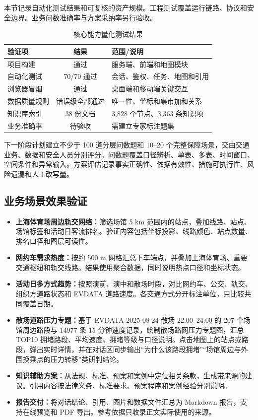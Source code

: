 \documentclass[a4paper,11pt]{article}
\newcommand{\term}[1]{\textbf{#1}}
\begin{document}
本节记录自动化测试结果和可复核的资产规模。工程测试覆盖运行链路、协议和安全边界。业务问数准确率与方案采纳率另行验收。

\begin{table}[ht]
  \centering
  \caption{核心能力量化测试结果}
  \label{tab:tests}
  \begin{tabularx}{\linewidth}{@{}lcX@{}}
    \toprule
    \rowcolor{TableHead}
    \sffamily\bfseries 验证项 & \sffamily\bfseries 结果 & \sffamily\bfseries 范围/说明 \\
    \midrule
    项目构建      & 通过    & 服务端、前端和地图模块 \\
    自动化测试    & 70/70 通过 & 会话、鉴权、任务、地图和引用 \\
    浏览器冒烟    & 通过    & 桌面端和移动端关键交互 \\
    数据质量规则  & 错误级全部通过 & 唯一性、坐标和集市加和关系 \\
    知识库索引    & 38 份文档 & 3,828 个节点、3,363 条知识项 \\
    业务准确率    & 待验收  & 需建立专家标注题集 \\
    \bottomrule
  \end{tabularx}
\end{table}

下一阶段计划建立不少于 100 道分层问数题和 10--20 个完整保障场景，交由交通业务、数据和安全人员分别评分。问数题覆盖口径辨析、单表、多表、时间窗口、空间条件和异常输入。方案评估记录事实正确性、依据有效性、措施可执行性、风险遗漏和人工改写量。

\subsection{业务场景效果验证}

\begin{itemize}
  \item \term{上海体育场周边轨交网络：}筛选场馆 5 km 范围内的站点，叠加线路、站点、场馆标签和活动日客流排名。验证内容包括坐标投影、线路颜色、站点数量、排名口径和图层可读性。
  \item \term{网约车需求热度：}按约 500 m 网格汇总下车端点，并叠加上海体育场、重要交通枢纽和轨交线路。结果使用聚合数据，同时说明热点口径和坐标状态。
  \item \term{活动日多方式趋势：}按照演前、演中和散场时段，对比网约车、公交、轨交、组织方道路状态和 EVDATA 道路速度。各交通方式分开标注单位，只比较共同覆盖日期。
  \item \term{散场道路压力专题：}基于 EVDATA 2025-08-24 散场 22:00--24:00 的 207 个场馆周边路段与 14977 条 15 分钟速度记录，绘制散场路网压力专题图，汇总 TOP10 拥堵路段、平均速度、拥堵等级与口径说明。点击地图上的站点或路段，弹出实时详情，并在对话区同步输出“为什么该路段拥堵”“场馆周边与外围换乘点的压力转移”类研判结论。
  \item \term{知识辅助方案：}从法规、标准、预案和案例中定位相关条款，生成带来源的建议。引用内容按法律义务、标准要求、预案程序和案例经验分别说明。
  \item \term{报告交付：}将对话结论、引用、图片和数据文件汇总为 Markdown 报告，支持在线预览和 PDF 导出。参考依据只收录正文实际使用的来源。
\end{itemize}
\end{document}
